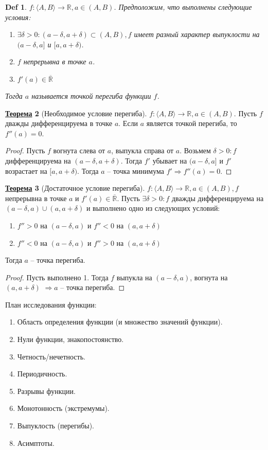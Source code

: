 \documentclass[12pt]{article}
\newenvironment{MyList}[1][4pt]{
  \begin{enumerate}[1.]
  \setlength{\parskip}{0pt}
  \setlength{\itemsep}{#1}
}{       
  \end{enumerate}
}
\def\R{\mathbb{R}}       %
\def\SO{\Rightarrow}     %
\theoremstyle{definition} %
\newtheorem{Thm}{\underline{Теорема}}[subsection] %
\theoremstyle{plain} %
\newtheorem{Def}[Thm]{Def} %
\theoremstyle{remark} %
\begin{document}
\begin{Def}
    $f : \langle A, B\rangle \to \R, a \in (A, B)$. Предположим, что выполнены следующие условия:
    \begin{MyList}
        \item $\exists \delta > 0 : (a - \delta, a + \delta) \subset (A, B), f$ имеет разный характер выпуклости на $(a - \delta, a]$ и $[a, a + \delta)$.
        \item $f$ непрерывна в точке $a$.
        \item $f'(a) \in \overline{\R}$
    \end{MyList}
    Тогда $a$ называется точкой перегиба функции $f$.
\end{Def}

\begin{Thm}[Необходимое условие перегиба]
    $f : \langle A, B\rangle \to \R, a \in (A, B)$. Пусть $f$ дважды дифференцируема в точке $a$. 
    Если $a$ является точкой перегиба, то $f''(a) = 0$.    
\end{Thm}

\begin{proof}
    Пусть $f$ вогнута слева от $a$, выпукла справа от $a$. Возьмем $\delta > 0 : f$ дифференцируема на $(a - \delta, a + \delta)$.
    Тогда $f'$ убывает на $(a - \delta, a]$ и $f'$ возрастает на $[a, a + \delta)$. Тогда $a$ -- точка минимума $f' \SO f''(a) = 0$.
\end{proof}

\begin{Thm}[Достаточное условие перегиба]
    $f : \langle A, B\rangle \to \R, a \in (A, B), f$ непрерывна в точке $a$ и $f'(a) \in \overline{\R}$.
    Пусть $\exists \delta > 0 : f$ дважды дифференцируема на $(a - \delta, a) \cup (a, a + \delta)$ и выполнено одно из следующих условий:
    \begin{MyList}
        \item $f'' > 0$ на $(a - \delta, a)$ и $f'' < 0$ на $(a, a + \delta)$ 
        \item $f'' < 0$ на $(a - \delta, a)$ и $f'' > 0$ на $(a, a + \delta)$   
    \end{MyList}     
    Тогда $a$ -- точка перегиба.
\end{Thm}

\begin{proof}
    Пусть выполнено 1. Тогда $f$ выпукла на $(a - \delta, a)$, вогнута на $(a, a + \delta)$
    $\SO a$ -- точка перегиба.  
\end{proof}

План исследования функции:
\begin{MyList}
    \item Область определения функции (и множество значений функции).
    \item Нули функции, знакопостоянство.
    \item Четность/нечетность.
    \item Периодичность.
    \item Разрывы функции.
    \item Монотонность (экстремумы).
    \item Выпуклость (перегибы).
    \item Асимптоты. 
\end{MyList}
\end{document}
